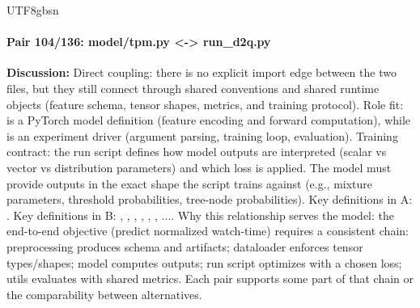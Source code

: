 \documentclass[11pt]{article}
\begin{document}
\begin{CJK*}{UTF8}{gbsn}
\paragraph{Pair 104/136: model/tpm.py <-> run\_d2q.py}
\textbf{Discussion:} Direct coupling: there is no explicit import edge between the two files, but they still connect through shared conventions and shared runtime objects (feature schema, tensor shapes, metrics, and training protocol). Role fit: \texttt{} is a PyTorch model definition (feature encoding and forward computation), while \texttt{} is an experiment driver (argument parsing, training loop, evaluation). Training contract: the run script defines how model outputs are interpreted (scalar vs vector vs distribution parameters) and which loss is applied. The model must provide outputs in the exact shape the script trains against (e.g., mixture parameters, threshold probabilities, tree-node probabilities). Key definitions in A: \texttt{}. Key definitions in B: \texttt{}, \texttt{}, \texttt{}, \texttt{}, \texttt{}, \texttt{}, .... Why this relationship serves the model: the end-to-end objective (predict normalized watch-time) requires a consistent chain: preprocessing produces schema and artifacts; dataloader enforces tensor types/shapes; model computes outputs; run script optimizes with a chosen loss; utils evaluates with shared metrics. Each pair supports some part of that chain or the comparability between alternatives.


\end{CJK*}
\end{document}
